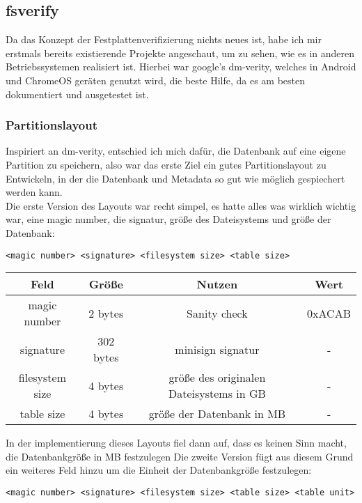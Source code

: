 \subsection{fsverify}
Da das Konzept der Festplattenverifizierung nichts neues ist, habe ich mir erstmals bereits existierende Projekte angeschaut, um zu sehen, wie es in anderen Betriebssystemen realisiert ist.
Hierbei war google's dm-verity, welches in Android und ChromeOS geräten genutzt wird, die beste Hilfe, da es am besten dokumentiert und ausgetestet ist.

\subsubsection{Partitionslayout}
Inspiriert an dm-verity, entschied ich mich dafür, die Datenbank auf eine eigene Partition zu speichern, also war das erste Ziel ein gutes Partitionslayout zu Entwickeln, in der die Datenbank und Metadata so gut wie möglich gespiechert werden kann.\\
Die erste Version des Layouts war recht simpel, es hatte alles was wirklich wichtig war, eine magic number, die signatur, größe des Dateisystems und größe der Datenbank:
\begin{verbatim}
<magic number> <signature> <filesystem size> <table size>
\end{verbatim}

\begin{center}
  \begin{tabular}{|c | c | c | c|}
    \hline
    Feld & Größe & Nutzen & Wert \\ [0.5ex]
    \hline
    magic number & 2 bytes & Sanity check & 0xACAB \\
    \hline
    signature & 302 bytes & minisign signatur & - \\
    \hline
    filesystem size & 4 bytes & größe des originalen Dateisystems in GB & - \\
    \hline
    table size & 4 bytes & größe der Datenbank in MB & - \\
    \hline
  \end{tabular}
\end{center}
In der implementierung dieses Layouts fiel dann auf, dass es keinen Sinn macht, die Datenbankgröße in MB festzulegen
Die zweite Version fügt aus diesem Grund ein weiteres Feld hinzu um die Einheit der Datenbankgröße festzulegen:
\begin{verbatim}
<magic number> <signature> <filesystem size> <table size> <table unit>
\end{verbatim}


